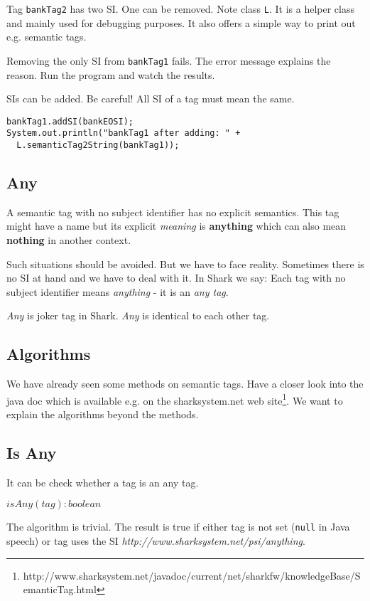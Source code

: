 Tag {\tt bankTag2} has two SI. One can be removed. Note class {\tt L}.
It is a helper class and mainly used for debugging purposes. It also
offers a simple way to print out e.g. semantic tags.

Removing the only SI from  {\tt bankTag1} fails. The error message explains the
reason. Run the program and watch the results.

SIs can be added. Be careful! All SI of a tag must mean the same.

\begin{verbatim}
bankTag1.addSI(bankEOSI);
System.out.println("bankTag1 after adding: " + 
  L.semanticTag2String(bankTag1));
\end{verbatim}

\subsection{Any}
\label{sec:AnyST}
A semantic tag with no subject identifier has no explicit semantics. This tag might have a name but its explicit {\it meaning} is {\bf anything} which can also mean {\bf nothing} in another context.

Such situations should be avoided. But we have to face reality. Sometimes there
is no SI at hand and we have to deal with it. In Shark we say: Each tag with no subject identifier means {\it anything} - it is an {\it any tag}.

{\it Any} is joker tag in Shark. {\it Any} is identical to each other tag.

\subsection{Algorithms}
We have already seen some methods on semantic tags. Have a closer look into the java doc which is available e.g. on the sharksystem.net web 
site\footnote{http://www.sharksystem.net/javadoc/current/net/sharkfw/knowledgeBase/SemanticTag.html}. 
We want to explain the algorithms beyond the methods.

\subsection{Is Any}
It can be check whether a tag is an any tag.

$isAny(tag): boolean$

The algorithm is trivial. The result is true if either tag is not set ({\tt null} in Java speech) or tag uses the SI {\it http://www.sharksystem.net/psi/anything}.

